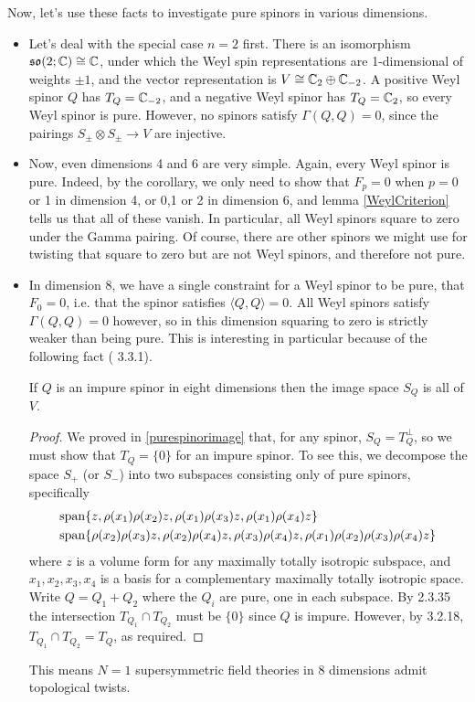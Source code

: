 \documentclass[10pt, oneside]{article}
\begin{document}
Now, let's use these facts to investigate pure spinors in various dimensions.
\vspace{-6pt}
\begin{itemize}
 \item Let's deal with the special case $n=2$ first.  There is an isomorphism $\mathfrak{so}(2;\mathbb{C}) \cong \mathbb{C}$, under which the Weyl spin representations are 1-dimensional of weights $\pm 1$, and the vector representation is $V \cong \mathbb{C}_2 \oplus \mathbb{C}_{-2}$.  A positive Weyl spinor $Q$ has $T_Q = \mathbb{C}_{-2}$, and a negative Weyl spinor has $T_Q = \mathbb{C}_{2}$, so every Weyl spinor is pure.  However, no spinors satisfy $\Gamma(Q,Q) = 0$, since the pairings $S_\pm \otimes S_\pm \to V$ are injective.
 
 \item Now, even dimensions 4 and 6 are very simple.  Again, every Weyl spinor is pure.  Indeed, by the corollary, we only need to show that $F_p = 0$ when $p = 0$ or 1 in dimension 4, or 0,1 or 2 in dimension 6, and lemma \ref{WeylCriterion} tells us that all of these vanish.  In particular, all Weyl spinors square to zero under the Gamma pairing.  Of course, there are other spinors we might use for twisting that square to zero but are not Weyl spinors, and therefore not pure.
 
 \item In dimension 8, we have a single constraint for a Weyl spinor to be pure, that $F_0 = 0$, i.e. that the spinor satisfies $\langle Q,Q \rangle = 0$.  All Weyl spinors satisfy $\Gamma(Q,Q) = 0$ however, so in this dimension squaring to zero is strictly weaker than being pure.  This is interesting in particular because of the following fact (\cite{Charlton} 3.3.1).
 \begin{prop}
 If $Q$ is an impure spinor in eight dimensions then the image space $S_Q$ is all of $V$.
 \end{prop}
 
 \begin{proof}
 We proved in \ref{purespinorimage} that, for any spinor, $S_Q = T_Q^\perp$, so we must show that $T_Q = \{0\}$ for an impure spinor.  To see this, we decompose the space $S_+$ (or $S_-$) into two subspaces consisting only of pure spinors, specifically
 \begin{align*}
 &\mathrm{span} \{z, \rho(x_1)\rho(x_2)z, \rho(x_1)\rho(x_3)z, \rho(x_1)\rho(x_4)z\} \\
 &\mathrm{span} \{\rho(x_2)\rho(x_3)z, \rho(x_2)\rho(x_4)z, \rho(x_3)\rho(x_4)z, \rho(x_1)\rho(x_2)\rho(x_3)\rho(x_4)z\}
 \end{align*}
 where $z$ is a volume form for any maximally totally isotropic subspace, and $x_1, x_2,x_3,x_4$ is a basis for a complementary maximally totally isotropic space.  Write $Q = Q_1 + Q_2$ where the $Q_i$ are pure, one in each subspace.  By \cite{Charlton} 2.3.35 the intersection $T_{Q_1} \cap T_{Q_2}$ must be $\{0\}$ since $Q$ is impure.  However, by \cite{Charlton} 3.2.18, $T_{Q_1} \cap T_{Q_2} = T_Q$, as required.
 \end{proof}
 This means $N=1$ supersymmetric field theories in 8 dimensions admit topological twists.


\end{itemize}
\end{document}
